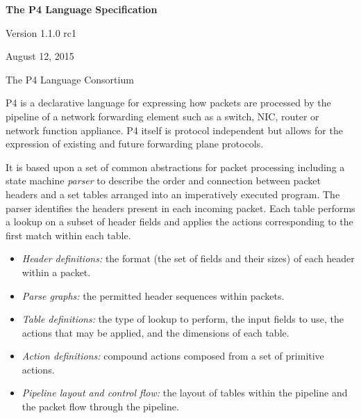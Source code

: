 \documentclass[12pt]{article}
\begin{document}
\vspace{2cm}

\centerline{\sffamily\bfseries\huge The P4 Language Specification}
\vspace{3mm}
\centerline{\sffamily\Large Version 1.1.0 rc1}
\vspace{3mm}
\centerline{\sffamily\large August 12, 2015}
\vspace{8mm}
\centerline{\sffamily\large The P4 Language Consortium}

\date{August 12, 2015}
\thispagestyle{firstpagestyle}


P4 is a declarative language for expressing how packets are processed by the 
pipeline of a network forwarding element such as a switch, NIC, router or 
network function appliance. P4 itself is protocol independent but allows for
the expression of existing and future forwarding plane protocols. 

It is based upon a set of common abstractions for packet processing including a
state machine \textit{parser} to describe the order and connection between
packet headers and a set \matchaction tables arranged into an imperatively
executed program. The parser identifies the headers present in each incoming
packet. Each \matchaction table performs a lookup on a subset of header fields
and applies the actions corresponding to the first match within each table.

\begin{itemize}
\item
\textit{Header definitions:} the format (the set of fields and their
sizes) of each header within a packet.
\item
\textit{Parse graphs:} the permitted header sequences within packets.
\item
\textit{Table definitions:} the type of lookup to perform, the input
fields to use, the actions that may be applied, and the dimensions of
each table.
\item
\textit{Action definitions:} compound actions composed from a set of
primitive actions.
\item
\textit{Pipeline layout and control flow:} the layout of tables within
the pipeline and the packet flow through the pipeline.
\end{itemize}
\end{document}
